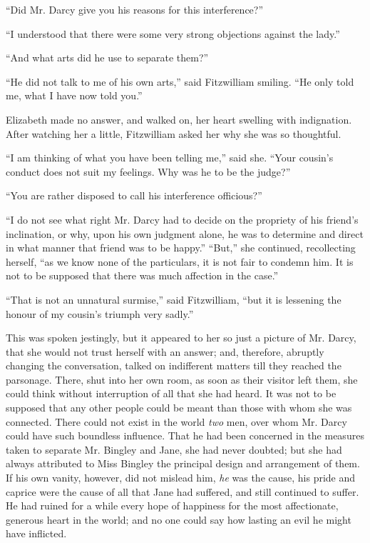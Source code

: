 “Did Mr. Darcy give you his reasons for this
interference?”

“I understood that there were some very strong objections
against the lady.”

“And what arts did he use to separate them?”

“He did not talk to me of his own arts,” said Fitzwilliam
smiling. “He only told me, what I have now
told you.”

Elizabeth made no answer, and walked on, her heart
swelling with indignation. After watching her a little,
Fitz\-william asked her why she was so thoughtful.

“I am thinking of what you have been telling me,”
said she. “Your cousin’s conduct does not suit my
feelings. Why was he to be the judge?”

“You are rather disposed to call his interference
officious?”

“I do not see what right Mr. Darcy had to decide on
the propriety of his friend’s inclination, or why, upon his
own judgment alone, he was to determine and direct in
what manner that friend was to be happy.” “But,” she
continued, recollecting herself, “as we know none of the
particulars, it is not fair to condemn him. It is not to
be supposed that there was much affection in the case.”

“That is not an unnatural surmise,” said Fitz\-william,
“but it is lessening the honour of my cousin’s triumph
very sadly.”

This was spoken jestingly, but it appeared to her so
just a picture of Mr. Darcy, that she would not trust
herself with an answer; and, therefore, abruptly changing
the conversation, talked on indifferent matters till they
reached the parsonage. There, shut into her own room,
as soon as their visitor left them, she could think without
interruption of all that she had heard. It was not to be
supposed that any other people could be meant than those
with whom she was connected. There could not exist in
the world \textit{two} men, over whom Mr. Darcy could have such
boundless influence. That he had been concerned in the
measures taken to separate Mr. Bingley and Jane, she had
never doubted; but she had always attributed to Miss
Bingley the principal design and arrangement of them.
If his own vanity, however, did not mislead him, \textit{he} was
the cause, his pride and caprice were the cause of all
that Jane had suffered, and still continued to suffer. He
had ruined for a while every hope of happiness for the most
affectionate, generous heart in the world; and no one
could say how lasting an evil he might have inflicted.

